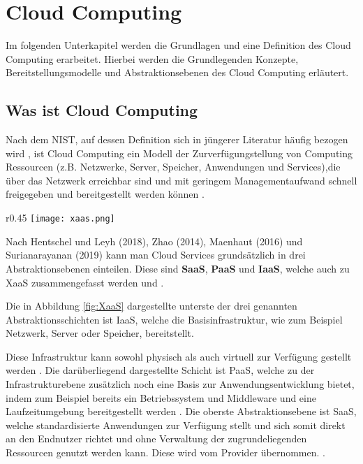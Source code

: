 \section{Cloud Computing}

Im folgenden Unterkapitel werden die Grundlagen und eine Definition des Cloud Computing erarbeitet. Hierbei werden die Grundlegenden Konzepte,
Bereitstellungsmodelle und Abstraktionsebenen des Cloud Computing erläutert.

\subsection{Was ist Cloud Computing}

Nach dem \ac{NIST}, auf dessen Definition sich in jüngerer Literatur häufig bezogen wird \cite[Vgl.][S. 4f]{Reinheimer2018}, ist Cloud Computing ein Modell der Zurverfügungstellung von Computing Ressourcen
(z.B. Netzwerke, Server, Speicher, Anwendungen und Services),die über das Netzwerk erreichbar sind und mit geringem Managementaufwand
schnell freigegeben und bereitgestellt werden können \cite[Vgl.][S. 2]{Mell2011}\cite[Vgl.][S. 5]{Reinheimer2018}.

\begin{wrapfigure}{r}{0.45\textwidth}
\centering
\texttt{[image: xaas.png]}
\caption{Eine Übersicht der Cloud Service Modelle \cite[Eigene Darstellung nach][S. 33]{Maenhaut2016}\cite[Ergänzt durch][]{Toroman2018}}
\label{fig:XaaS}
\end{wrapfigure}

Nach Hentschel und Leyh (2018), Zhao (2014), Maenhaut (2016) und Surianarayanan (2019) kann man Cloud Services grundsätzlich in drei Abstraktionsebenen einteilen. Diese sind \textbf{\ac{SaaS}},
\textbf{\ac{PaaS}} und \textbf{\ac{IaaS}}, welche auch zu \ac{XaaS} zusammengefasst werden
\cite[Vgl.][S. 9]{Reinheimer2018}\cite[Vgl.][S. 143f]{Zhao2014}\cite[Vgl.][S. 32ff]{Maenhaut2016} und \cite[Vgl.][S. 226ff]{Surianarayanan2019}.

Die in Abbildung \ref{fig:XaaS} dargestellte unterste der drei genannten Abstraktionsschichten ist \ac{IaaS},
welche die Basisinfrastruktur, wie zum Beispiel Netzwerk, Server oder Speicher, bereitstellt.

Diese Infrastruktur kann sowohl physisch als auch virtuell zur Verfügung gestellt werden \cite[Vgl.][S. 9f]{Reinheimer2018}.
Die darüberliegend dargestellte Schicht ist \ac{PaaS}, welche zu der Infrastrukturebene zusätzlich noch eine Basis zur Anwendungsentwicklung bietet, indem zum Beispiel
bereits ein Betriebssystem und Middleware und eine Laufzeitumgebung bereitgestellt werden \cite[Vgl.][S. 10]{Reinheimer2018}.
Die oberste Abstraktionsebene ist \ac{SaaS}, welche standardisierte Anwendungen zur Verfügung stellt und sich somit direkt an den Endnutzer richtet und
ohne Verwaltung der zugrundeliegenden Ressourcen genutzt werden kann. Diese wird vom Provider übernommen.
\cite[Vgl.][S. 11]{Reinheimer2018}.

